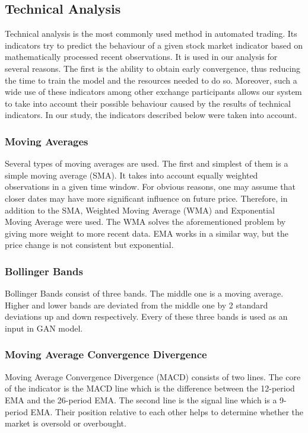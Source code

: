 \documentclass[11pt]{article} %
\begin{document}
\subsection{Technical Analysis}
Technical analysis is the most commonly used method in automated trading. Its indicators try to predict the behaviour of a given stock market indicator based on mathematically processed recent observations. It is used in our analysis for several reasons. The first is the ability to obtain early convergence, thus reducing the time to train the model and the resources needed to do so. Moreover, such a wide use of these indicators among other exchange participants allows our system to take into account their possible behaviour caused by the results of technical indicators. In our study, the indicators described below were taken into account. 

\subsubsection{Moving Averages}
Several types of moving averages are used. The first and simplest of them is a simple moving average (SMA). It takes into account equally weighted observations in a given time window. For obvious reasons, one may assume that closer dates may have more significant influence on future price. Therefore, in addition to the SMA, Weighted Moving Average (WMA) and Exponential Moving Average were used. The WMA solves the aforementioned problem by giving more weight to more recent data. EMA works in a similar way, but the price change is not consistent but exponential.

\subsubsection{Bollinger Bands}
Bollinger Bands consist of three bands. The middle one is a moving average. Higher and lower bands are deviated from the middle one by 2 standard deviations up and down respectively. Every of these three bands is used as an input in GAN model.

\subsubsection{Moving Average Convergence Divergence}
Moving Average Convergence Divergence (MACD) consists of two lines. The core of the indicator is the MACD line which is the difference between the 12-period EMA and the 26-period EMA. The second line is the signal line which is a 9-period EMA. Their position relative to each other helps to determine whether the market is oversold or overbought.
\end{document}
